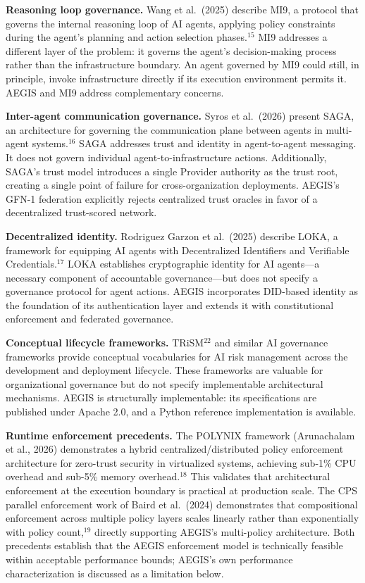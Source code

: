 \documentclass{IEEEcsmag}
\begin{document}
{\bf Reasoning loop governance.} Wang et al.\ (2025) describe MI9, a protocol that governs the internal reasoning loop of AI agents, applying policy constraints during the agent's planning and action selection phases.$^{15}$ MI9 addresses a different layer of the problem: it governs the agent's decision-making process rather than the infrastructure boundary. An agent governed by MI9 could still, in principle, invoke infrastructure directly if its execution environment permits it. AEGIS and MI9 address complementary concerns.

{\bf Inter-agent communication governance.} Syros et al.\ (2026) present SAGA, an architecture for governing the communication plane between agents in multi-agent systems.$^{16}$ SAGA addresses trust and identity in agent-to-agent messaging. It does not govern individual agent-to-infrastructure actions. Additionally, SAGA's trust model introduces a single Provider authority as the trust root, creating a single point of failure for cross-organization deployments. AEGIS's GFN-1 federation explicitly rejects centralized trust oracles in favor of a decentralized trust-scored network.

{\bf Decentralized identity.} Rodriguez Garzon et al.\ (2025) describe LOKA, a framework for equipping AI agents with Decentralized Identifiers and Verifiable Credentials.$^{17}$ LOKA establishes cryptographic identity for AI agents---a necessary component of accountable governance---but does not specify a governance protocol for agent actions. AEGIS incorporates DID-based identity as the foundation of its authentication layer and extends it with constitutional enforcement and federated governance.

{\bf Conceptual lifecycle frameworks.} TRiSM$^{22}$ and similar AI governance frameworks provide conceptual vocabularies for AI risk management across the development and deployment lifecycle. These frameworks are valuable for organizational governance but do not specify implementable architectural mechanisms. AEGIS is structurally implementable: its specifications are published under Apache 2.0, and a Python reference implementation is available.

{\bf Runtime enforcement precedents.} The POLYNIX framework (Arunachalam et al., 2026) demonstrates a hybrid centralized/distributed policy enforcement architecture for zero-trust security in virtualized systems, achieving sub-1\% CPU overhead and sub-5\% memory overhead.$^{18}$ This validates that architectural enforcement at the execution boundary is practical at production scale. The CPS parallel enforcement work of Baird et al.\ (2024) demonstrates that compositional enforcement across multiple policy layers scales linearly rather than exponentially with policy count,$^{19}$ directly supporting AEGIS's multi-policy architecture. Both precedents establish that the AEGIS enforcement model is technically feasible within acceptable performance bounds; AEGIS's own performance characterization is discussed as a limitation below.
\end{document}

